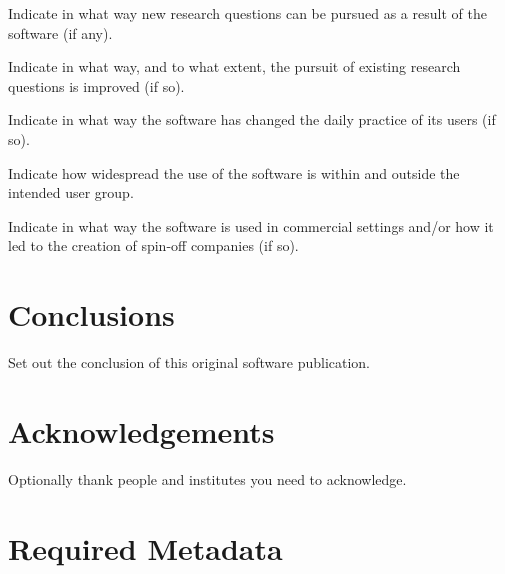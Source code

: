 \documentclass[preprint,12pt, a4paper]{elsarticle}
\begin{document}
Indicate in what way new research questions can be pursued as a result of the software (if any).

Indicate in what way, and to what extent, the pursuit of existing research questions is improved (if so).

Indicate in what way the software has changed the daily practice of its users (if so).

Indicate how widespread the use of the software is within and outside the intended user group.

Indicate in what way the software is used in commercial settings and/or how it led to the creation of spin-off companies (if so).

\section{Conclusions}
\label{}

Set out the conclusion of this original software publication.

\section*{Acknowledgements}
\label{}

Optionally thank people and institutes you need to acknowledge. 



{}







\section*{Required Metadata}
\label{}
\end{document}
